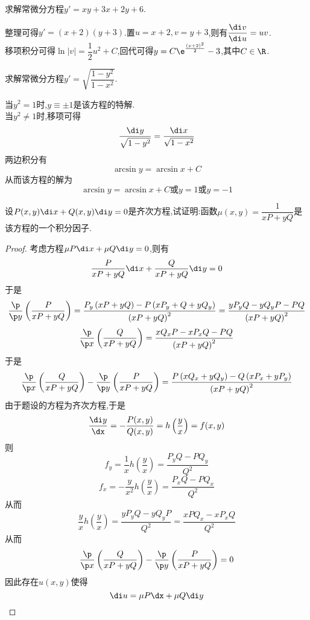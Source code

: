 \documentclass{ctexart}
\begin{document}
\pagestyle{empty}
\begin{center}
    \large{}
\end{center}
\begin{problem}[L.7.1]
    求解常微分方程$y'=xy+3x+2y+6$.
\end{problem}
\begin{solution}
    整理可得$y'=(x+2)(y+3)$.置$u=x+2,v=y+3$,则有$\dfrac{\di v}{\di u}=uv$.\\
    移项积分可得$\ln|v|=\dfrac12u^2+C$,回代可得$y=C\e^{\frac{\left(x+2\right)^2}{2}}-3$,其中$C\in\R$.
\end{solution}
\begin{problem}[L.7.2]
    求解常微分方程$y'=\sqrt{\dfrac{1-y^2}{1-x^2}}$.
\end{problem}
\begin{solution}
    当$y^2=1$时,$y\equiv\pm1$是该方程的特解.\\
    当$y^2\neq1$时,移项可得
    \[\dfrac{\di y}{\sqrt{1-y^2}}=\dfrac{\di x}{\sqrt{1-x^2}}\]
    两边积分有
    \[\arcsin y=\arcsin x+C\]
    从而该方程的解为
    \[\arcsin y=\arcsin x+C\text{或}y=1\text{或}y=-1\]
\end{solution}
\begin{problem}[L.7.3]
    设$P(x,y)\di x+Q(x,y)\di y=0$是齐次方程,试证明:函数$\mu(x,y)=\dfrac{1}{xP+yQ}$是该方程的一个积分因子.
\end{problem}
\begin{proof}
    考虑方程$\mu P\di x+\mu Q\di y=0$,则有
    \[\dfrac{P}{xP+yQ}\di x+\dfrac{Q}{xP+yQ}\di y=0\]
    于是
    \[
        \dfrac{\p}{\p y}\left(\dfrac{P}{xP+yQ}\right)
        = \dfrac{P_y\left(xP+yQ\right)-P\left(xP_y+Q+yQ_y\right)}{\left(xP+yQ\right)^2}
        = \dfrac{yP_yQ-yQ_yP-PQ}{\left(xP+yQ\right)^2}
    \]
    \[\dfrac{\p}{\p x}\left(\dfrac{Q}{xP+yQ}\right)
        = \dfrac{xQ_xP-xP_xQ-PQ}{\left(xP+yQ\right)^2}\]
    于是
    \[
        \dfrac{\p}{\p x}\left(\dfrac{Q}{xP+yQ}\right)-\dfrac{\p}{\p y}\left(\dfrac{P}{xP+yQ}\right)
        =\dfrac{P\left(xQ_x+yQ_y\right)-Q\left(xP_x+yP_y\right)}{\left(xP+yQ\right)^2}
    \]
    由于题设的方程为齐次方程,于是
    \[\dfrac{\di y}{\dx}=-\dfrac{P(x,y)}{Q(x,y)}=h\left(\dfrac{y}{x}\right)=f(x,y)\]
    则
    \[f_y=\dfrac{1}{x}h\left(\dfrac yx\right)=\dfrac{P_yQ-PQ_y}{Q^2}\]
    \[f_x=-\dfrac{y}{x^2}h\left(\dfrac yx\right)=\dfrac{P_xQ-PQ_x}{Q^2}\]
    从而
    \[\dfrac yxh\left(\dfrac yx\right)=\dfrac{yP_yQ-yQ_yP}{Q^2}=\dfrac{xPQ_x-xP_xQ}{Q^2}\]
    从而
    \[\dfrac{\p}{\p x}\left(\dfrac{Q}{xP+yQ}\right)-\dfrac{\p}{\p y}\left(\dfrac{P}{xP+yQ}\right)=0\]
    因此存在$u(x,y)$使得
    \[\di u=\mu P\dx+\mu Q\di y\]
\end{proof}
\end{document}

